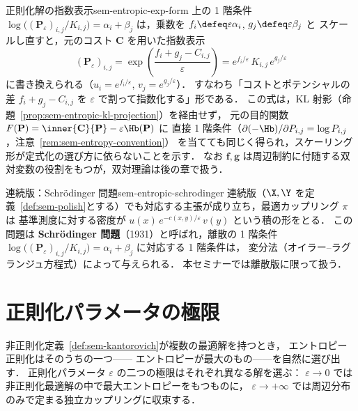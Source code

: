 \begin{remark}{正則化解の指数表示}{sem-entropic-exp-form}
  上の 1 階条件 $\log\bigl((\mathbf{P}_\varepsilon)_{i,j}/K_{i,j}\bigr) = \alpha_i + \beta_j$ は，乗数を $f_i \defeq \varepsilon\alpha_i$, $g_j \defeq \varepsilon\beta_j$ と
  スケールし直すと，元のコスト $\mathbf{C}$ を用いた指数表示
  \[
    (\mathbf{P}_\varepsilon)_{i,j}
    = \exp\!\left(\frac{f_i + g_j - C_{i,j}}{\varepsilon}\right)
    = e^{f_i / \varepsilon}\, K_{i,j}\, e^{g_j / \varepsilon}
  \]
  に書き換えられる（$u_i = e^{f_i / \varepsilon}$, $v_j = e^{g_j / \varepsilon}$）．
  すなわち「コストとポテンシャルの差 $f_i + g_j - C_{i,j}$ を $\varepsilon$ で割って指数化する」形である．
  この式は，KL 射影（命題~\ref{prop:sem-entropic-kl-projection}）を経由せず，
  元の目的関数 $F(\mathbf{P}) = \inner{\mathbf{C}}{\mathbf{P}} - \varepsilon\Hb(\mathbf{P})$ に
  直接 1 階条件（$\partial(-\Hb)/\partial P_{i,j} = \log P_{i,j}$，注意~\ref{rem:sem-entropy-convention}）
  を当てても同じく得られ，スケーリング形が定式化の選び方に依らないことを示す．
  なお $\mathbf{f}, \mathbf{g}$ は周辺制約に付随する双対変数の役割をもつが，双対理論は後の章で扱う．
\end{remark}

\begin{remark}{連続版：Schr\"odinger 問題}{sem-entropic-schrodinger}
  連続版（$\X, \Y$ を定義~\ref{def:sem-polish}とする）でも対応する主張が成り立ち，最適カップリング $\pi$ は
  基準測度に対する密度が $u(x)\, e^{-c(x,y)/\varepsilon}\, v(y)$ という積の形をとる．
  この問題は \textbf{Schr\"odinger 問題}（1931）と呼ばれ，離散の 1 階条件
  $\log\bigl((\mathbf{P}_\varepsilon)_{i,j} / K_{i,j}\bigr) = \alpha_i + \beta_j$ に対応する 1 階条件は，
  変分法（オイラー–ラグランジュ方程式）によって与えられる．
  本セミナーでは離散版に限って扱う．
\end{remark}

\section{正則化パラメータの極限}
\label{sec:sem-epsilon-limits}

非正則化定義~\ref{def:sem-kantorovich}が複数の最適解を持つとき，
エントロピー正則化はそのうちの一つ——
エントロピーが最大のもの——を自然に選び出す．
正則化パラメータ $\varepsilon$ の二つの極限はそれぞれ異なる解を選ぶ：
$\varepsilon \to 0$ では非正則化最適解の中で最大エントロピーをもつものに，
$\varepsilon \to +\infty$ では周辺分布のみで定まる独立カップリングに収束する．

